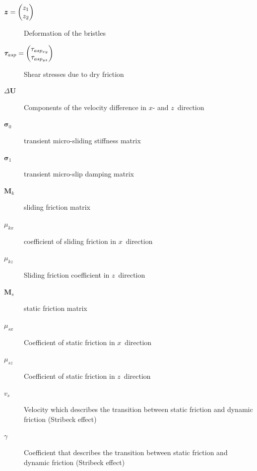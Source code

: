 \begin{description}
\item[$\boldsymbol{z} = \begin{pmatrix} z_1 \cr z_2 \end{pmatrix}$] Deformation of the bristles
\item[$\boldsymbol{\tau}_{asp} = \begin{pmatrix} \tau_{asp_{xy}} \cr
\tau_{asp_{yz}}\end{pmatrix}$] Shear stresses due to dry friction
\item[$\Delta\boldsymbol{U}$] Components of the velocity difference in $x$- and $z$~direction
\item[$\boldsymbol{\sigma}_0$] transient micro-sliding stiffness matrix
\item[$\boldsymbol{\sigma}_1$] transient micro-slip damping matrix
\item[$\boldsymbol{M}_k$] sliding friction matrix
\item[$\mu_{kx}$] coefficient of sliding friction in $x$~direction
\item[$\mu_{kz}$] Sliding friction coefficient in $z$~direction
\item[$\boldsymbol{M}_s$] static friction matrix
\item[$\mu_{sx}$] Coefficient of static friction in $x$~direction
\item[$\mu_{sz}$] Coefficient of static friction in $z$~direction
\item[$v_s$] Velocity which describes the transition between static friction and dynamic friction (Stribeck effect)
\item[$\gamma$] Coefficient that describes the transition between static friction and dynamic friction (Stribeck effect)
\end{description}

